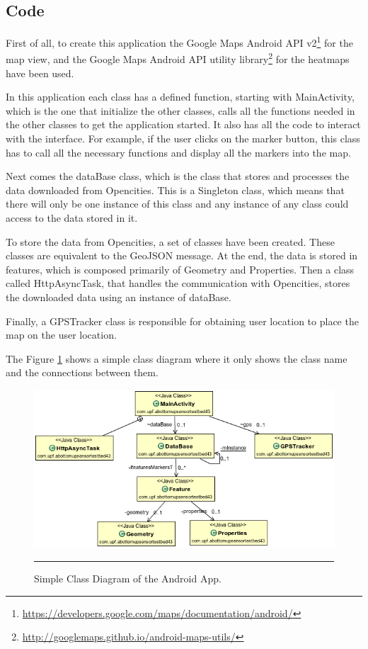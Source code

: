 \documentclass[12pt, a4paper,twoside]{tesi_upf}
\begin{document}
    \subsection{Code}
      First of all, to create this application the Google Maps Android API v2\footnote{\url{https://developers.google.com/maps/documentation/android/}} for the map view, and the Google Maps Android API utility library\footnote{\url{http://googlemaps.github.io/android-maps-utils/}} for the heatmaps have been used.
      
      In this application each class has a defined function, starting with MainActivity, which is the one that initialize the other classes, calls all the functions needed in the other classes to get the application started.
      It also has all the code to interact with the interface. For example, if the user clicks on the marker button, this class has to call all the necessary functions and display all the markers into the map.
      
      Next comes the dataBase class, which is the class that stores and processes the data downloaded from Opencities. This is a Singleton class, which means that there will only be one instance of this class and any instance of any class could access to the data stored in it.
      
      To store the data from Opencities, a set of classes have been created. These classes are equivalent to the GeoJSON message. At the end, the data is stored in features, which is composed primarily of Geometry and Properties.
      Then a class called HttpAsyncTask, that handles the communication with Opencities, stores the downloaded data using an instance of dataBase.
      
      Finally, a GPSTracker class is responsible for obtaining user location to place the map on the user location.
           
      The Figure \ref{fig:ClassDiagram} shows a simple class diagram where it only shows the class name and the connections between them.
      
      \begin{figure}[htbp]
        \centering
          \includegraphics[page=1,scale=0.8]{./Figures/SmallClassDiagram.png}
        \rule{20em}{0.5pt}
        \caption[Simple Class Diagram of the Android App]{Simple Class Diagram of the Android App.}
        \label{fig:ClassDiagram}
      \end{figure}
      
\end{document}
